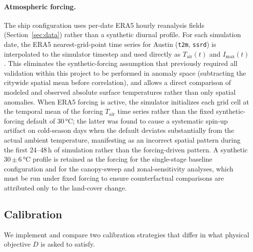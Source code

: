 \documentclass[12pt, letterpaper]{article}
\begin{document}
\paragraph{Atmospheric forcing.}
\label{par:forcing}
The ship configuration uses per-date ERA5 hourly reanalysis fields
(Section~\ref{sec:data}) rather than a synthetic diurnal profile. For each
simulation date, the ERA5 nearest-grid-point time series for Austin
(\texttt{t2m}, \texttt{ssrd}) is interpolated to the simulator timestep and
used directly as $T_{\mathrm{air}}(t)$ and $I_{\max}(t)$. This eliminates
the synthetic-forcing assumption that previously required all validation
within this project to be performed in anomaly space (subtracting the
citywide spatial mean before correlation), and allows a direct comparison
of modeled and observed absolute surface temperatures rather than only
spatial anomalies. When ERA5 forcing is active, the simulator initializes
each grid cell at the temporal mean of the forcing $T_{\mathrm{air}}$
time series rather than the fixed synthetic-forcing default of
30\,\si{\degreeCelsius}; the latter was found to cause a systematic
spin-up artifact on cold-season days when the default deviates
substantially from the actual ambient temperature, manifesting as an
incorrect spatial pattern during the first 24--48\,h of simulation rather
than the forcing-driven pattern. A synthetic 30\,$\pm$\,6\,\si{\degreeCelsius}
profile is retained as the forcing for the single-stage baseline configuration
and for the canopy-sweep and zonal-sensitivity analyses, which must be
run under fixed forcing to ensure counterfactual comparisons are attributed
only to the land-cover change.

\subsection{Calibration}
\label{sec:calibration}

We implement and compare two calibration strategies that differ in what
physical objective $D$ is asked to satisfy.
\end{document}
